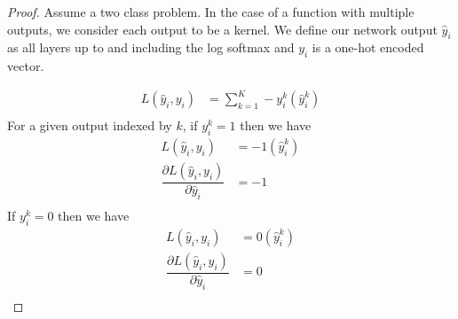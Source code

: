 \begin{proof}
Assume a two class problem. In the case of a function with multiple outputs, we consider each output to be a kernel. We define our network output $\hat y_i$ as all layers up to and including the log softmax and $y_i$ is a one-hot encoded vector. 

\begin{align}
    L(\hat y_i,  y_i)
    &=  \sum_{k=1}^K -y_i^k(\hat y_i^k) \\
\end{align}
For a given output indexed by $k$, if $y_i^k = 1$ then we have
\begin{align}
    L(\hat y_i,  y_i)
    &=  -1(\hat y_i^k) \\
    \dfrac{\partial L(\hat y_i,  y_i)}{\partial \hat y_i} &= -1\\
\end{align}
If $y_i^k = 0$ then we have
\begin{align}
    L(\hat y_i,  y_i)
    &=  0(\hat y_i^k) \\
    \dfrac{\partial L(\hat y_i,  y_i)}{\partial \hat y_i} &= 0\\
\end{align}


    

\end{proof}

